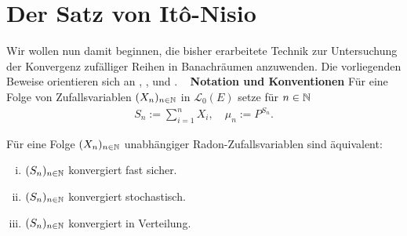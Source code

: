 \section{Der Satz von Itô-Nisio}
    Wir wollen nun damit beginnen, die bisher erarbeitete Technik zur Untersuchung der Konvergenz zufälliger Reihen in Banachräumen anzuwenden.
    Die vorliegenden Beweise orientieren sich an \cite{ito-nisio}, \cite{ledoux-talagrand}, \cite{li-queffelec} und \cite{van-neerven}.  
    \newline \ \newline 
    \textbf{Notation und Konventionen}\newline
    Für eine Folge von Zufallsvariablen $(X_n)_{n \in \mathbb{N}}$ in $\mathcal{L}_0(E)$ setze für $n \in \mathbb{N}$
    \begin{align*}
    S_n := \sum_{i=1}^n X_i, 
    \quad 
    \mu_n := P^{S_n} .
    \end{align*}
\begin{theorem}
    Für eine Folge $(X_n)_{n \in \mathbb{N}}$ unabhängiger Radon-Zufallsvariablen sind äquivalent:
    \begin{enumerate}[(i)]
        \item $(S_n)_{n \in \mathbb{N}}$ konvergiert fast sicher.
        \item $(S_n)_{n \in \mathbb{N}}$ konvergiert stochastisch.
        \item $(S_n)_{n \in \mathbb{N}}$ konvergiert in Verteilung. 
    \end{enumerate}
\end{theorem}

